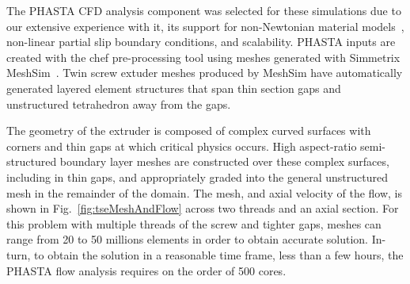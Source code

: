 The PHASTA CFD analysis component was selected for these simulations
due to our extensive experience with it, its support for non-Newtonian material
models~\cite{marrero2014numerical,phastaPartialSlip2014}, non-linear partial
slip boundary conditions, and scalability.
PHASTA inputs are created with the chef pre-processing tool using meshes
generated with Simmetrix MeshSim~\cite{simmodsuite}.
Twin screw extuder meshes produced by MeshSim have automatically generated layered
element structures that span thin section gaps and unstructured tetrahedron away
from the gaps.

The geometry of the extruder is composed of complex curved surfaces with
corners and thin gaps at which critical physics occurs.
High aspect-ratio semi-structured boundary layer meshes are constructed over
these complex surfaces, including in thin gaps, and appropriately graded into
the general unstructured mesh in the remainder of the domain.
The mesh, and axial velocity of the flow, is shown in
Fig.~\ref{fig:tseMeshAndFlow} across two threads and an axial section.
For this problem with multiple threads of the screw and tighter gaps, meshes can
range from 20 to 50 millions elements in order to obtain accurate solution.
In-turn, to obtain the solution in a reasonable time frame, less than a few hours,
the PHASTA flow analysis requires on the order of 500 cores.


